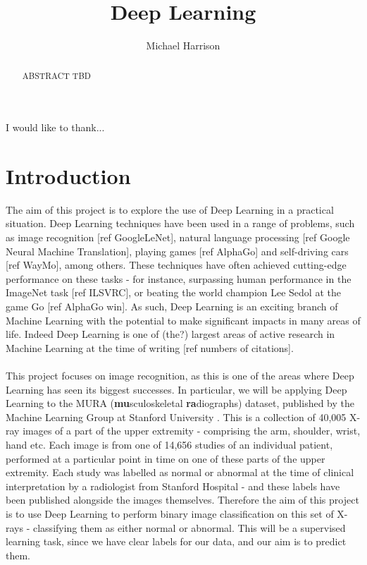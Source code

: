 \documentclass[11pt]{article} %
\title{Deep Learning}
\author{Michael Harrison}
\theoremstyle{plain}
\theoremstyle{definition}
\begin{document}
\maketitle

\declaration

\begin{acknowledgement}
I would like to thank...
\end{acknowledgement}

\begin{abstract}
ABSTRACT TBD
\end{abstract}


\newpage
\setcounter{page}{1}
\section{Introduction}
The aim of this project is to explore the use of Deep Learning in a practical situation. Deep Learning techniques have been used in a range of problems, such as image recognition [ref GoogleLeNet], natural language processing [ref Google Neural Machine Translation], playing games [ref AlphaGo] and self-driving cars [ref WayMo], among others. These techniques have often achieved cutting-edge performance on these tasks - for instance, surpassing human performance in the ImageNet task [ref ILSVRC], or beating the world champion Lee Sedol at the game Go [ref AlphaGo win]. As such, Deep Learning is an exciting branch of Machine Learning with the potential to make significant impacts in many areas of life. Indeed Deep Learning is one of (the?) largest areas of active research in Machine Learning at the time of writing [ref numbers of citations].
\\
\\
\noindent
This project focuses on image recognition, as this is one of the areas where Deep Learning has seen its biggest successes. In particular, we will be applying Deep Learning to the MURA (\textbf{mu}sculoskeletal \textbf{ra}diographs) dataset, published by the Machine Learning Group at Stanford University \cite{MURA2017}. This is a collection of 40,005 X-ray images of a part of the upper extremity - comprising the arm, shoulder, wrist, hand etc. Each image is from one of 14,656 studies of an individual patient, performed at a particular point in time on one of these parts of the upper extremity. Each study was labelled as normal or abnormal at the time of clinical interpretation by a radiologist from Stanford Hospital - and these labels have been published alongside the images themselves. Therefore the aim of this project is to use Deep Learning to perform binary image classification on this set of X-rays - classifying them as either normal or abnormal. This will be a supervised learning task, since we have clear labels for our data, and our aim is to predict them. 
\end{document}
